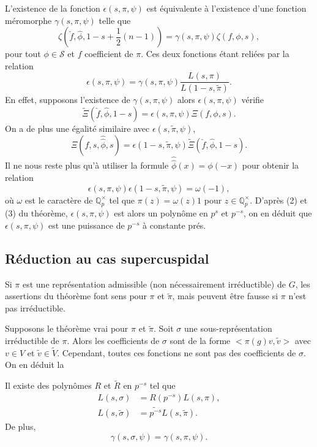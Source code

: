 L'existence de la fonction $\epsilon(s, \pi, \psi)$ est équivalente à l'existence d'une fonction méromorphe $\gamma(s,\pi,\psi)$ telle que
\begin{equation}
\zeta(\check{f}, \hat{\phi}, 1-s+\frac{1}{2}(n-1))=\gamma(s, \pi, \psi)\zeta(f, \phi, s),
\end{equation}
pour tout $\phi \in \mathcal{S}$ et $f$ coefficient de $\pi$. Ces deux fonctions étant reliées par la relation
\begin{equation}
\label{gammaepsilon}
\epsilon(s,\pi,\psi)=\gamma(s,\pi,\psi)\frac{L(s,\pi)}{L(1-s,\tilde{\pi})}.
\end{equation}
En effet, supposons l'existence de $\gamma(s,\pi,\psi)$ alors $\epsilon(s,\pi,\psi)$ vérifie 
\begin{equation}
\tilde{\Xi}(\check{f}, \hat{\phi}, 1-s) = \epsilon(s, \pi, \psi)\Xi(f, \phi, s).
\end{equation}
On a de plus une égalité similaire avec $\epsilon(s,\tilde{\pi},\psi)$,
\begin{equation}
\Xi(f, s, \hat{\hat{\phi}}, s)=\epsilon(1-s, \tilde{\pi}, \psi)\tilde{\Xi}(\check{f}, \hat{\phi}, 1-s).
\end{equation}
Il ne nous reste plus qu'à utiliser la formule $\hat{\hat{\phi}}(x)=\phi(-x)$ pour obtenir la relation
\begin{equation}
\epsilon(s, \pi, \psi)\epsilon(1-s, \tilde{\pi}, \psi)=\omega(-1),
\end{equation}
où $\omega$ est le caractère de $\mathbb{Q}_p^\times$ tel que $\pi(z)=\omega(z)1$ pour $z\in \mathbb{Q}_p^\times$. D'après (2) et (3) du théorème, $\epsilon(s, \pi, \psi)$ est alors un polynôme en $p^s$ et $p^{-s}$, on en déduit que $\epsilon(s, \pi, \psi)$ est une puissance de $p^{-s}$ à constante prés.

\subsection{Réduction au cas supercuspidal}

Si $\pi$ est une représentation admissible (non nécessairement irréductible) de $G$, les assertions du théorème font sens pour $\pi$ et $\tilde{\pi}$, mais peuvent être fausse si $\pi$ n'est pas irréductible.

Supposons le théorème vrai pour $\pi$ et $\tilde{\pi}$. Soit $\sigma$ une sous-représentation irréductible de $\pi$. Alors les coefficients de $\sigma$ sont de la forme $<\pi(g)v,\tilde{v}>$ avec $v\in V$ et $\tilde{v} \in \tilde{V}$. Cependant, toutes ces fonctions ne sont pas des coefficients de $\sigma$. On en déduit la
\begin{proposition}
Il existe des polynômes $R$ et $\tilde{R}$ en $p^{-s}$ tel que
\begin{align}
L(s,\sigma)&=R(p^{-s})L(s,\pi), \\
L(s,\tilde{\sigma})&=\tilde{p^{-s}}L(s,\tilde{\pi}).
\end{align}
De plus,
\begin{equation}
\gamma(s,\sigma,\psi)=\gamma(s,\pi,\psi).
\end{equation}
\end{proposition}

